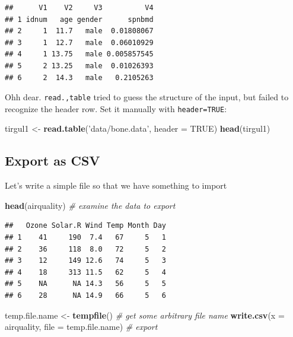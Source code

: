 \documentclass[]{book}
\newenvironment{Shaded}{\begin{snugshade}}{\end{snugshade}}
\newcommand{\KeywordTok}[1]{\textcolor[rgb]{0.13,0.29,0.53}{\textbf{#1}}}
\newcommand{\DataTypeTok}[1]{\textcolor[rgb]{0.13,0.29,0.53}{#1}}
\newcommand{\StringTok}[1]{\textcolor[rgb]{0.31,0.60,0.02}{#1}}
\newcommand{\CommentTok}[1]{\textcolor[rgb]{0.56,0.35,0.01}{\textit{#1}}}
\newcommand{\OtherTok}[1]{\textcolor[rgb]{0.56,0.35,0.01}{#1}}
\newcommand{\NormalTok}[1]{#1}
\theoremstyle{definition}
\theoremstyle{definition}
\theoremstyle{definition}
\theoremstyle{remark}
\begin{document}
\begin{verbatim}
##      V1    V2     V3          V4
## 1 idnum   age gender      spnbmd
## 2     1  11.7   male  0.01808067
## 3     1  12.7   male  0.06010929
## 4     1 13.75   male 0.005857545
## 5     2 13.25   male  0.01026393
## 6     2  14.3   male   0.2105263
\end{verbatim}

Ohh dear. \texttt{read.,table} tried to guess the structure of the
input, but failed to recognize the header row. Set it manually with
\texttt{header=TRUE}:

\begin{Shaded}
\begin{Highlighting}[]
\NormalTok{tirgul1 <-}\StringTok{ }\KeywordTok{read.table}\NormalTok{(}\StringTok{'data/bone.data'}\NormalTok{, }\DataTypeTok{header =} \OtherTok{TRUE}\NormalTok{) }
\KeywordTok{head}\NormalTok{(tirgul1)}
\end{Highlighting}
\end{Shaded}

\subsection{Export as CSV}\label{export-as-csv}

Let's write a simple file so that we have something to import

\begin{Shaded}
\begin{Highlighting}[]
\KeywordTok{head}\NormalTok{(airquality) }\CommentTok{#  examine the data to export}
\end{Highlighting}
\end{Shaded}

\begin{verbatim}
##   Ozone Solar.R Wind Temp Month Day
## 1    41     190  7.4   67     5   1
## 2    36     118  8.0   72     5   2
## 3    12     149 12.6   74     5   3
## 4    18     313 11.5   62     5   4
## 5    NA      NA 14.3   56     5   5
## 6    28      NA 14.9   66     5   6
\end{verbatim}

\begin{Shaded}
\begin{Highlighting}[]
\NormalTok{temp.file.name <-}\StringTok{ }\KeywordTok{tempfile}\NormalTok{() }\CommentTok{# get some arbitrary file name}
\KeywordTok{write.csv}\NormalTok{(}\DataTypeTok{x =}\NormalTok{ airquality, }\DataTypeTok{file =}\NormalTok{ temp.file.name) }\CommentTok{# export}
\end{Highlighting}
\end{Shaded}
\end{document}
